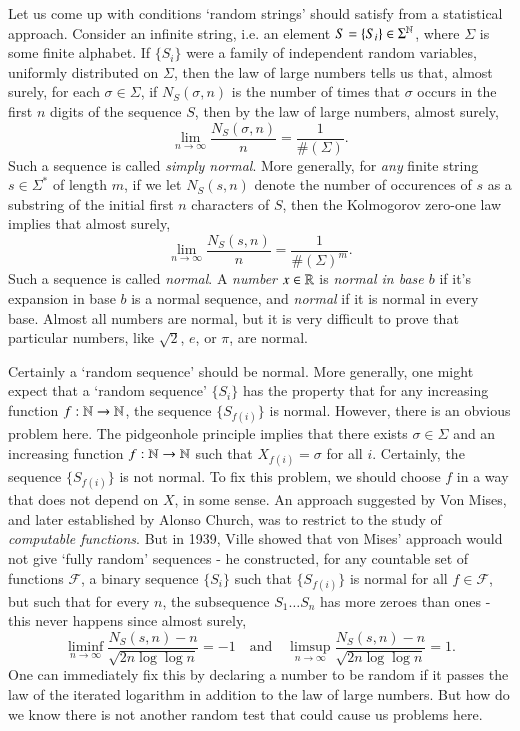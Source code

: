 Let us come up with conditions `random strings' should satisfy from a statistical approach. Consider an infinite string, i.e. an element $S = \{ S_i \} \in \Sigma^{\operatorname{\mathbb{N}}}$, where $\Sigma$ is some finite alphabet. If $\{ S_i \}$ were a family of independent random variables, uniformly distributed on $\Sigma$, then the law of large numbers tells us that, almost surely, for each $\sigma \in \Sigma$, if $N_S(\sigma,n)$ is the number of times that $\sigma$ occurs in the first $n$ digits of the sequence $S$, then by the law of large numbers, almost surely,
%
\[ \lim_{n \to \infty} \frac{N_S(\sigma,n)}{n} = \frac{1}{\#(\Sigma)}. \]
%
Such a sequence is called \emph{simply normal}. More generally, for \emph{any} finite string $s \in \Sigma^*$ of length $m$, if we let $N_S(s,n)$ denote the number of occurences of $s$ as a substring of the initial first $n$ characters of $S$, then the Kolmogorov zero-one law implies that almost surely,
%
\[ \lim_{n \to \infty} \frac{N_S(s,n)}{n} = \frac{1}{\#(\Sigma)^m}. \]
%
Such a sequence is called \emph{normal}. A \emph{number} $x \in \operatorname{\mathbb{R}}$ is \emph{normal in base $b$} if it's expansion in base $b$ is a normal sequence, and \emph{normal} if it is normal in every base. Almost all numbers are normal, but it is very difficult to prove that particular numbers, like $\sqrt{2}$, $e$, or $\pi$, are normal.

Certainly a `random sequence' should be normal. More generally, one might expect that a `random sequence' $\{ S_i \}$ has the property that for any increasing function $f: \operatorname{\mathbb{N}} \to \operatorname{\mathbb{N}}$, the sequence $\{ S_{f(i)} \}$ is normal. However, there is an obvious problem here. The pidgeonhole principle implies that there exists $\sigma \in \Sigma$ and an increasing function $f: \operatorname{\mathbb{N}} \to \operatorname{\mathbb{N}}$ such that $X_{f(i)} = \sigma$ for all $i$. Certainly, the sequence $\{ S_{f(i)} \}$ is not normal. To fix this problem, we should choose $f$ in a way that does not depend on $X$, in some sense. An approach suggested by Von Mises, and later established by Alonso Church, was to restrict to the study of \emph{computable functions}. But in 1939, Ville showed that von Mises' approach would not give `fully random' sequences - he constructed, for any countable set of functions $\mathcal{F}$, a binary sequence $\{ S_i \}$ such that $\{ S_{f(i)} \}$ is normal for all $f \in \mathcal{F}$, but such that for every $n$, the subsequence $S_1 \dots S_n$ has more zeroes than ones - this never happens since almost surely,
%
\[ \liminf_{n \to \infty} \frac{N_S(s,n) - n}{\sqrt{2n \log \log n}} = -1 \quad\text{and}\quad \limsup_{n \to \infty} \frac{N_S(s,n) - n}{\sqrt{2n \log \log n}} = 1. \]
%
One can immediately fix this by declaring a number to be random if it passes the law of the iterated logarithm in addition to the law of large numbers. But how do we know there is not another random test that could cause us problems here.

